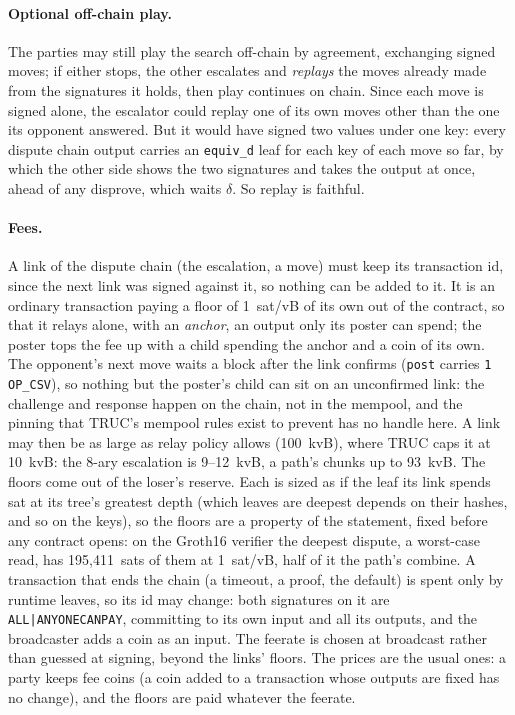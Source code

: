 \documentclass[11pt]{article}
\newcommand{\tx}[1]{\texttt{#1}}
\begin{document}
\paragraph{Optional off-chain play.} The parties may still play the
search off-chain by agreement, exchanging signed moves; if either stops,
the other escalates and \emph{replays} the moves already made from the
signatures it holds, then play continues on chain. Since each move is
signed alone, the escalator could replay one of its own moves other than
the one its opponent answered. But it would have signed two values under
one key: every dispute chain output carries an \tx{equiv\_d} leaf for each key
of each move so far, by which the other side shows the two signatures
and takes the output at once, ahead of any disprove, which waits
$\delta$. So replay is faithful.

\paragraph{Fees.} A link of the dispute chain (the escalation, a move)
must keep its transaction id, since the next link was signed against it,
so nothing can be added to it. It is an ordinary transaction paying a
floor of 1~sat/vB of its own out of the contract, so that it relays
alone, with an \emph{anchor}, an output only its poster can spend; the
poster tops the fee up with a child spending the anchor and a coin of
its own. The opponent's next move waits a block after the link confirms
(\tx{post} carries \texttt{1 OP\_CSV}), so nothing but the poster's child
can sit on an unconfirmed link: the challenge and response happen on the
chain, not in the mempool, and the pinning that TRUC's mempool rules
exist to prevent has no handle here. A link may then be as large as
relay policy allows (100~kvB), where TRUC caps it at 10~kvB: the 8-ary
escalation is 9--12~kvB, a path's chunks up to 93~kvB. The floors come
out of the loser's reserve. Each is sized as if the leaf its link spends
sat at its tree's greatest depth (which leaves are deepest depends on
their hashes, and so on the keys), so the floors are a property of the
statement, fixed before any contract opens: on the Groth16 verifier the
deepest dispute, a worst-case read, has 195,411~sats of them at
1~sat/vB, half of it the path's combine. A transaction that ends the chain (a
timeout, a proof, the default) is spent only by runtime leaves, so its
id may change: both signatures on it are \texttt{ALL|ANYONECANPAY},
committing to its own input and all its outputs, and the broadcaster
adds a coin as an input. The feerate is chosen at broadcast rather than
guessed at signing, beyond the links' floors. The prices are the usual
ones: a party keeps fee coins (a coin added to a transaction whose
outputs are fixed has no change), and the floors are paid whatever the
feerate.
\end{document}

